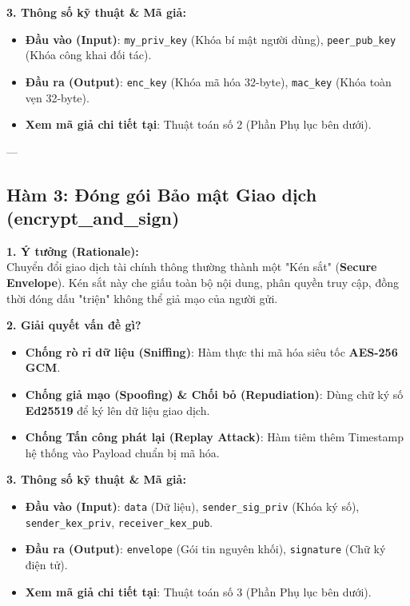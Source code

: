 \documentclass[11pt,a4paper]{article}
\begin{document}
\textbf{3. Thông số kỹ thuật \& Mã giả:}
\begin{itemize}[noitemsep]
    \item \textbf{Đầu vào (Input)}: \texttt{my\_priv\_key} (Khóa bí mật người dùng), \texttt{peer\_pub\_key} (Khóa công khai đối tác).
    \item \textbf{Đầu ra (Output)}: \texttt{enc\_key} (Khóa mã hóa 32-byte), \texttt{mac\_key} (Khóa toàn vẹn 32-byte).
    \item \textbf{Xem mã giả chi tiết tại}: Thuật toán số 2 (Phần Phụ lục bên dưới).
\end{itemize}

---

\subsection{Hàm 3: Đóng gói Bảo mật Giao dịch (encrypt\_and\_sign)}

\textbf{1. Ý tưởng (Rationale):} \\
Chuyển đổi giao dịch tài chính thông thường thành một "Kén sắt" (\textbf{Secure Envelope}). Kén sắt này che giấu toàn bộ nội dung, phân quyền truy cập, đồng thời đóng dấu "triện" không thể giả mạo của người gửi.

\textbf{2. Giải quyết vấn đề gì?}
\begin{itemize}[noitemsep]
    \item \textbf{Chống rò rỉ dữ liệu (Sniffing)}: Hàm thực thi mã hóa siêu tốc \textbf{AES-256 GCM}.
    \item \textbf{Chống giả mạo (Spoofing) \& Chối bỏ (Repudiation)}: Dùng chữ ký số \textbf{Ed25519} để ký lên dữ liệu giao dịch.
    \item \textbf{Chống Tấn công phát lại (Replay Attack)}: Hàm tiêm thêm Timestamp hệ thống vào Payload chuẩn bị mã hóa.
\end{itemize}

\textbf{3. Thông số kỹ thuật \& Mã giả:}
\begin{itemize}[noitemsep]
    \item \textbf{Đầu vào (Input)}: \texttt{data} (Dữ liệu), \texttt{sender\_sig\_priv} (Khóa ký số), \texttt{sender\_kex\_priv}, \texttt{receiver\_kex\_pub}.
    \item \textbf{Đầu ra (Output)}: \texttt{envelope} (Gói tin nguyên khối), \texttt{signature} (Chữ ký điện tử).
    \item \textbf{Xem mã giả chi tiết tại}: Thuật toán số 3 (Phần Phụ lục bên dưới).
\end{itemize}
\end{document}
